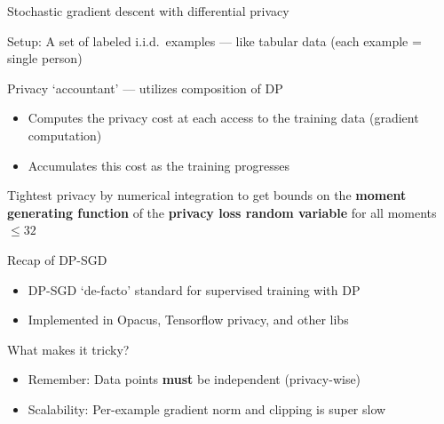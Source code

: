 \documentclass[12pt,aspectratio=169,handout]{beamer}
\begin{document}
\begin{frame}{Stochastic gradient descent with differential privacy}

Setup: A set of labeled i.i.d.\ examples --- like tabular data (each example = single person)

Privacy `accountant' --- utilizes composition of DP
\begin{itemize}
	\item Computes the privacy cost at each access to the training data (gradient computation)
	\item Accumulates this cost as the training progresses
\end{itemize}

Tightest privacy by numerical integration to get bounds on the \textbf{moment generating function} of the \textbf{privacy loss random variable} for all moments $\leq 32$


\end{frame}



\begin{frame}{Recap of DP-SGD}

\begin{itemize}
\item DP-SGD `de-facto' standard for supervised training with DP
\item Implemented in Opacus, Tensorflow privacy, and other libs
\end{itemize}

What makes it tricky?

\begin{itemize}
\item Remember: Data points \textbf{must} be independent (privacy-wise)
\item Scalability: Per-example gradient norm and clipping is super slow
\end{itemize}



\end{frame}
\end{document}
